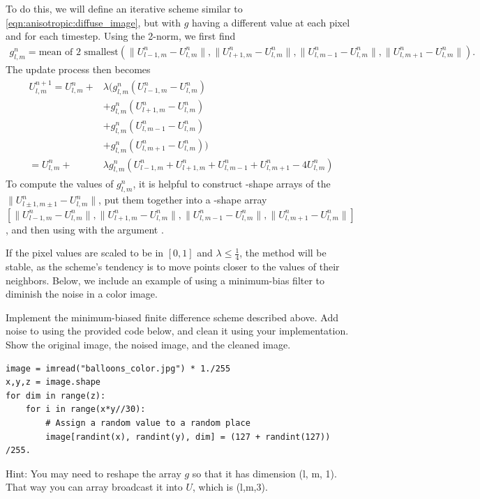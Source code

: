 To do this, we will define an iterative scheme similar to \eqref{eqn:anisotropic:diffuse_image}, but with $g$ having a different value at each pixel and for each timestep.
Using the 2-norm, we first find
\begin{align}
g^n_{l,m} = \text{mean of 2 smallest}\left ( \|U^n_{l-1,m}-U^n_{l,m}\|, \|U^n_{l+1,m}-U^n_{l,m}\|, \|U^n_{l,m-1}-U^n_{l,m}\|, \|U^n_{l,m+1}-U^n_{l,m}\| \right).
\label{eqn:anisotropic:gp}
\end{align}
The update process then becomes
\begin{align}
\begin{split}
U_{l,m}^{n+1} = U_{l,m}^n + & \lambda (g^n_{l,m}(U_{l-1,m}^n - U_{l,m}^n) \\
					& + g^n_{l,m}(U_{l+1,m}^n - U_{l,m}^n) \\
					& + g^n_{l,m}(U_{l,m-1}^n - U_{l,m}^n) \\
					& + g^n_{l,m}(U_{l,m+1}^n - U_{l,m}^n))\\
=U_{l,m}^n + &\lambda g^n_{l,m}(U_{l-1,m}^n + U_{l+1,m}^n  + U_{l,m-1}^n + U_{l,m+1}^n - 4U_{l,m}^n)
\label{eqn:anisotropic:min_bias}
\end{split}
\end{align}
To compute the values of $g^n_{l,m}$, it is helpful to construct -shape arrays of the $\|U^n_{l\pm1,m\pm1}-U^n_{l,m}\|$, put them together into a -shape array $[\|U^n_{l-1,m}-U^n_{l,m}\|, \|U^n_{l+1,m}-U^n_{l,m}\|, \|U^n_{l,m-1}-U^n_{l,m}\|, \|U^n_{l,m+1}-U^n_{l,m}\|]$, and then using  with the argument .

If the pixel values are scaled to be in $[0,1]$ and $\lambda\leq \frac14$, the method will be stable, as the scheme's tendency is to move points closer to the values of their neighbors.
Below, we include an example of using a minimum-bias filter to diminish the noise in a color image.

\begin{problem}

Implement the minimum-biased finite difference scheme described above.
Add noise to  using the provided code below, and clean it using your implementation.
Show the original image, the noised image, and the cleaned image.

\begin{lstlisting}
image = imread("balloons_color.jpg") * 1./255
x,y,z = image.shape
for dim in range(z):
    for i in range(x*y//30):
        # Assign a random value to a random place
        image[randint(x), randint(y), dim] = (127 + randint(127)) /255.
\end{lstlisting}
Hint: You may need to reshape the array $g$ so that it has dimension (l, m, 1). That way you can array broadcast it into $U$, which is (l,m,3).

\end{problem}

